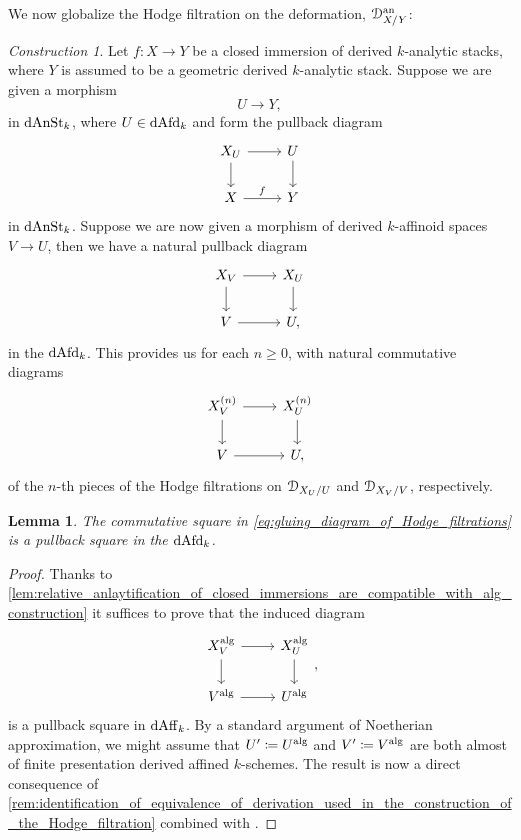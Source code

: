 \documentclass[10pt,a4paper,reqno]{amsart} %
\theoremstyle{plain}
\newtheorem{lem}[thm]{Lemma}
\theoremstyle{definition}
\theoremstyle{remark}
\numberwithin{equation}{section}
\newtheorem{construction}[thm]{Construction}
\begin{document}
We now globalize the Hodge filtration on the deformation, $\mathcal D^\mathrm{an}_{X/ Y}$:

\begin{construction}
    Let $f \colon X \to Y$ be a closed immersion of derived $k$-analytic stacks, where $Y$ is assumed to be a geometric derived $k$-analytic stack. Suppose we are given a morphism
        \[
            U \to Y,  
        \]
    in $\mathrm{dAnSt}_k$, where $U \in \mathrm{dAfd}_k$ and form the pullback diagram
        \[
        \begin{tikzcd}
            X_U \ar{r} \ar{d} & U \ar{d} \\
            X \ar{r}{f} & Y  
        \end{tikzcd}
        \]
    in $\mathrm{dAnSt}_k$. Suppose we are now given a morphism of derived $k$-affinoid spaces $V \to U$, then we have a natural pullback diagram
        \[
        \begin{tikzcd}
            X_V \ar{r} \ar{d} & X_U \ar{d} \\
            V \ar{r} & U,  
        \end{tikzcd}
        \]
    in the \infcat $\mathrm{dAfd}_k$. This provides us for each $n \ge 0$, with natural commutative diagrams
        \begin{equation} \label{eq:gluing_diagram_of_Hodge_filtrations}
        \begin{tikzcd}
            X_V^{(n)} \ar{r} \ar{d} & X_U^{(n)} \ar{d} \\
            V \ar{r} & U,
        \end{tikzcd}
        \end{equation}
    of the $n$-th pieces of the Hodge filtrations on $\mathcal D_{X_U/ U}$ and $\mathcal D_{X_V/ V}$, respectively.
\end{construction}


\begin{lem} \label{lem:preservation_of_Hodge_filtration_under_pullback}
    The commutative square in \eqref{eq:gluing_diagram_of_Hodge_filtrations} is a pullback square in the \infcat $\mathrm{dAfd}_k$.
\end{lem}

\begin{proof} Thanks to \cref{lem:relative_anlaytification_of_closed_immersions_are_compatible_with_alg_construction}
    it suffices to prove that the induced diagram
        \[
        \begin{tikzcd}
            X_V\alg \ar{r} \ar{d} & X_U \alg \ar{d} \\
            V \alg \ar{r} & U\alg  
        \end{tikzcd},
        \]
    is a pullback square in $\mathrm{dAff}_k$. By a standard argument of Noetherian approximation, we might assume that $U' \coloneqq U^\mathrm{alg} $ and $V' \coloneqq V^\mathrm{alg}$ are
    both almost of finite presentation derived affined $k$-schemes. The result is now a direct consequence of \cref{rem:identification_of_equivalence_of_derivation_used_in_the_construction_of_the_Hodge_filtration}
    combined with \cite[Proposition 5.12]{Porta_Yu_Representability}.
\end{proof}
\end{document}
